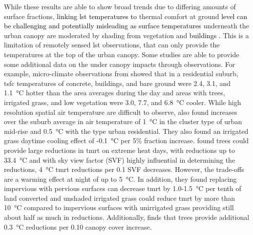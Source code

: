 \documentclass[final,3p,times,authoryear]{elsarticle}
\newcommand{\add}[1]{\textcolor{black}{#1}}
\newcommand{\remove}[1]{\textcolor{red}{\st{}}}
\begin{document}
While these results are able to show broad trends due to differing amounts of surface fractions, \remove{they cannot entirely predict the influences on}\add{linking \gls{lst} temperatures to} thermal comfort at\remove{the} ground \remove{level,}\add{level can be challenging and potentially misleading \citep{Coutts2016d,Stewart2021} as surface temperatures} underneath the urban canopy \remove{where surface temperatures}are moderated by shading from vegetation and \remove{buildings.}\add{buildings \citep{Coutts2015,Lee2018,Krayenhoff2021}.} This is a limitation of remotely sensed \gls{lst} observations, that can only provide the temperatures at the top of the urban canopy. Some studies are able to provide some additional data on the under canopy impacts through observations. For example, micro-climate observations from \cite{Broadbent2017a} showed that in a residential suburb, \gls{tsfc} temperatures of concrete, buildings, and bare ground were 2.4, 3.1, and 1.1\SI{}{\degreeCelsius} hotter than the area averages during the day and areas with trees, irrigated grass, and low vegetation were 3.0, 7.7, and 6.8\SI{}{\degreeCelsius} cooler. While high resolution spatial air temperature are difficult to observe, \cite{Broadbent2017a} also found increases over the suburb average in air temperature of 1\SI{}{\degreeCelsius} in the cluster type of urban mid-rise and 0.5\SI{}{\degreeCelsius} with the type urban residential. They also found an irrigated grass daytime cooling effect of -0.1\SI{}{\degreeCelsius} per 5\% fraction increase. \cite{Middel2019a} found trees could provide large reductions in \gls{tmrt} on extreme heat days, with reductions up to 33.4\SI{}{\degreeCelsius} and with sky view factor (SVF) highly influential in determining the reductions, 4\SI{}{\degreeCelsius} \gls{tmrt} reductions per 0.1 SVF decreases. However, the trade-offs are a warming effect at night of up to 5\SI{}{\degreeCelsius}. In addition, they found replacing impervious with pervious surfaces can decrease \gls{tmrt} by 1.0-1.5\SI{}{\degreeCelsius} per tenth of land converted and unshaded irrigated grass could reduce \gls{tmrt} by more than 10\SI{}{\degreeCelsius} compared to impervious surfaces with unirrigated grass providing still about half as much in reductions. Additionally, \cite{Krayenhoff2021} finds that trees provide additional 0.3\SI{}{\degreeCelsius} reductions per 0.10 canopy cover increase.
\end{document}

